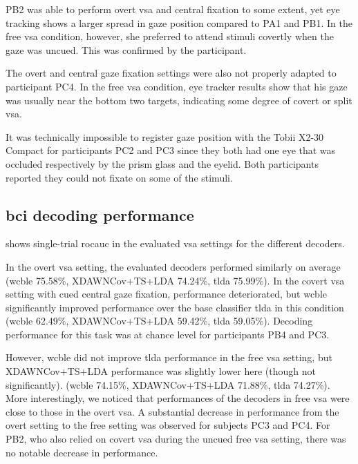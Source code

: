 PB2 was able to perform overt \ac{vsa} and central fixation to some extent,
yet eye tracking shows a larger spread in gaze position compared to
PA1 and PB1.
In the free \ac{vsa} condition, however, she preferred to attend
stimuli covertly when the gaze was uncued.
This was confirmed by the participant.

The overt and central gaze fixation settings were also not properly adapted to
participant PC4.
In the free \ac{vsa} condition, eye tracker results show that his gaze was usually near the
bottom two targets, indicating some degree of covert or split \ac{vsa}.

It was technically impossible to register gaze position with the Tobii X2-30
Compact for participants PC2 and PC3 since they both had one eye that was
occluded respectively by the prism glass and the eyelid.
Both participants reported they could not fixate on some of the
stimuli.

\subsection{\Acs{bci} decoding performance}

 shows single-trial
\ac{rocauc} in the evaluated \ac{vsa} settings for the different decoders.


In the overt \ac{vsa} setting, the evaluated decoders performed similarly on average
(\ac{wcble} 75.58\%, XDAWNCov+TS+LDA 74.24\%, \ac{tlda} 75.99\%).
In the covert \ac{vsa} setting with cued central gaze fixation, performance deteriorated,
but \ac{wcble} significantly improved performance over the base classifier
\ac{tlda} in this condition
(\ac{wcble} 62.49\%, XDAWNCov+TS+LDA 59.42\%, \ac{tlda} 59.05\%).
Decoding performance for this task was at chance level for participants PB4 and
PC3.

However, \ac{wcble} did not improve \ac{tlda} performance in the free \ac{vsa} setting, but
XDAWNCov+TS+LDA performance was slightly lower here (though not
significantly).
(\ac{wcble} 74.15\%, XDAWNCov+TS+LDA 71.88\%, \ac{tlda} 74.27\%).
More interestingly, we noticed that performances of the decoders in free
\ac{vsa} were close to those in the overt \ac{vsa}.
A substantial decrease in performance from the overt setting to the free
setting was observed for
subjects PC3 and PC4.
For PB2, who also relied on covert \ac{vsa} during the uncued free \ac{vsa}
setting, there was no notable decrease in performance.

